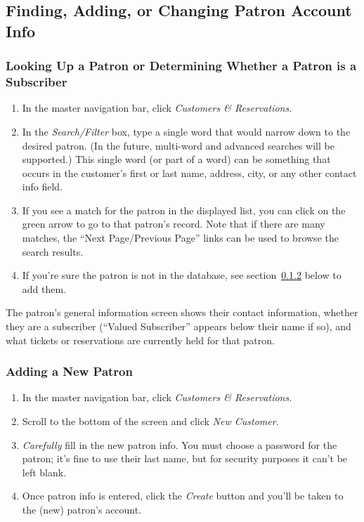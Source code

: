\subsection{Finding,  Adding, or Changing Patron Account Info}
\label{sec:boa-admin}

\subsubsection{Looking Up a Patron or Determining Whether a Patron is a Subscriber}
\label{sec:lookup}

\begin{enumerate}
\item In the master navigation bar, click \emph{Customers \&
    Reservations}.
\item In the \emph{Search/Filter} box, type a single word that would
  narrow down to the desired patron.  (In the future, multi-word and
  advanced searches will be supported.)  This single word (or part of a
  word) can be something that occurs in the customer's first or last
  name, address, city, or any other contact info field.
\item If you see a match for the patron in the displayed list, you can
  click on the green arrow to go to that patron's record.  Note that if
  there are many matches, the ``Next Page/Previous Page'' links can be
  used to browse the search results.
\item If you're sure the patron is not in the database, see
  section~\ref{sec:addpatron} below to add them.
\end{enumerate}

The patron's general information screen shows their contact information,
whether they are a subscriber (``Valued Subscriber'' appears below their
name if so), and what tickets or reservations are currently held for
that patron.

\subsubsection{Adding a New Patron}
\label{sec:addpatron}

\begin{enumerate}
\item In the master navigation bar, click \emph{Customers \&
    Reservations.} 
\item Scroll to the bottom of the screen and click  \emph{New
    Customer}.
\item \emph{Carefully} fill in the new patron info.  You must choose a
  password for the patron; it's fine to use their last name, but for
  security purposes it can't be left blank.
\item Once patron info is entered, click the \emph{Create} button and
  you'll be taken to the (new) patron's account.
\end{enumerate}

